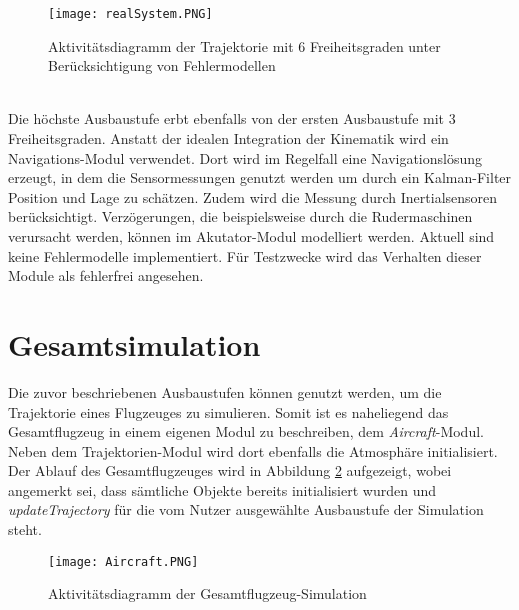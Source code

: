 \begin{figure}[h]
	\texttt{[image: realSystem.PNG]}
	\caption{Aktivitätsdiagramm der Trajektorie mit 6 Freiheitsgraden unter Berücksichtigung von Fehlermodellen}
	\label{fig:realSys}
\end{figure}\\
Die höchste Ausbaustufe erbt ebenfalls von der ersten Ausbaustufe mit 3 Freiheitsgraden. Anstatt der idealen Integration der Kinematik wird ein Navigations-Modul verwendet. Dort wird im Regelfall eine Navigationslösung erzeugt, in dem die Sensormessungen genutzt werden um durch ein Kalman-Filter Position und Lage zu schätzen. Zudem wird die Messung durch Inertialsensoren berücksichtigt. Verzögerungen, die beispielsweise durch die Rudermaschinen verursacht werden, können im Akutator-Modul modelliert werden. Aktuell sind keine Fehlermodelle implementiert. Für Testzwecke wird das Verhalten dieser Module als fehlerfrei angesehen.

\section{Gesamtsimulation}
Die zuvor beschriebenen Ausbaustufen können genutzt werden, um die Trajektorie eines Flugzeuges zu simulieren. Somit ist es naheliegend das Gesamtflugzeug in einem eigenen Modul zu beschreiben, dem \textit{Aircraft}-Modul.\\
Neben dem Trajektorien-Modul wird dort ebenfalls die Atmosphäre initialisiert. Der Ablauf des Gesamtflugzeuges wird in Abbildung \ref{fig:Aircraft} aufgezeigt, wobei angemerkt sei, dass sämtliche Objekte bereits initialisiert wurden und \textit{updateTrajectory} für die vom Nutzer ausgewählte Ausbaustufe der Simulation steht.
\begin{figure}[h]
	\centering\texttt{[image: Aircraft.PNG]}
	\caption{Aktivitätsdiagramm der Gesamtflugzeug-Simulation}
	\label{fig:Aircraft}
\end{figure}\\
